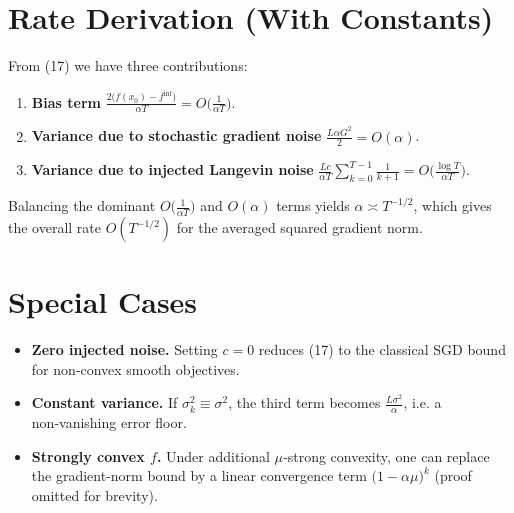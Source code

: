 \documentclass{article}
\begin{document}
\section*{Rate Derivation (With Constants)}
From (17) we have three contributions:
\begin{enumerate}
\item \textbf{Bias term} $\displaystyle \frac{2\bigl(f(x_0)-f^{\inf}\bigr)}{\alpha T}=O\!\bigl(\tfrac{1}{\alpha T}\bigr)$.
\item \textbf{Variance due to stochastic gradient noise} $\displaystyle \frac{L\alpha G^{2}}{2}=O(\alpha)$.
\item \textbf{Variance due to injected Langevin noise} $\displaystyle \frac{L c}{\alpha T}\sum_{k=0}^{T-1}\frac{1}{k+1}=O\!\bigl(\tfrac{\log T}{\alpha T}\bigr)$.
\end{enumerate}
Balancing the dominant $O\!\bigl(\tfrac{1}{\alpha T}\bigr)$ and $O(\alpha)$ terms yields $\alpha\asymp T^{-1/2}$,
which gives the overall rate $O(T^{-1/2})$ for the averaged squared gradient norm.

\section*{Special Cases}
\begin{itemize}
\item \textbf{Zero injected noise.} Setting $c=0$ reduces (17) to the classical SGD bound for non‑convex smooth objectives.
\item \textbf{Constant variance.} If $\sigma_k^{2}\equiv\sigma^{2}$, the third term becomes $\frac{L\sigma^{2}}{\alpha}$, i.e. a non‑vanishing error floor.
\item \textbf{Strongly convex $f$.} Under additional $\mu$‑strong convexity, one can replace the gradient‑norm bound by a linear convergence term $\bigl(1-\alpha\mu\bigr)^{k}$ (proof omitted for brevity).
\end{itemize}
\end{document}
